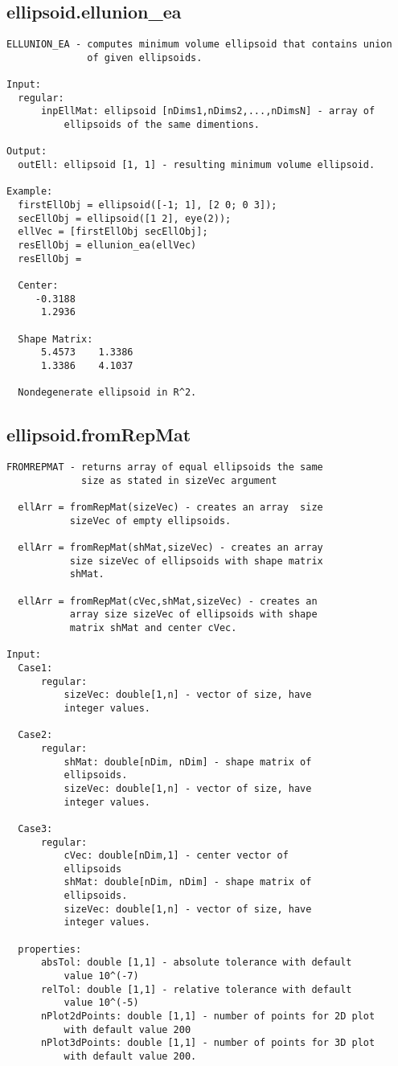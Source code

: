 \subsection{\texorpdfstring{ellipsoid.ellunion\_ea}{ellunion\_ea}}\label{method:ellipsoid.ellunionea}
\begin{verbatim}
ELLUNION_EA - computes minimum volume ellipsoid that contains union
              of given ellipsoids.

Input:
  regular:
      inpEllMat: ellipsoid [nDims1,nDims2,...,nDimsN] - array of
          ellipsoids of the same dimentions.

Output:
  outEll: ellipsoid [1, 1] - resulting minimum volume ellipsoid.

Example:
  firstEllObj = ellipsoid([-1; 1], [2 0; 0 3]);
  secEllObj = ellipsoid([1 2], eye(2));
  ellVec = [firstEllObj secEllObj];
  resEllObj = ellunion_ea(ellVec)
  resEllObj =

  Center:
     -0.3188
      1.2936

  Shape Matrix:
      5.4573    1.3386
      1.3386    4.1037

  Nondegenerate ellipsoid in R^2.
\end{verbatim}
\subsection{\texorpdfstring{ellipsoid.fromRepMat}{fromRepMat}}\label{method:ellipsoid.fromRepMat}
\begin{verbatim}
FROMREPMAT - returns array of equal ellipsoids the same
             size as stated in sizeVec argument

  ellArr = fromRepMat(sizeVec) - creates an array  size
           sizeVec of empty ellipsoids.

  ellArr = fromRepMat(shMat,sizeVec) - creates an array
           size sizeVec of ellipsoids with shape matrix
           shMat.

  ellArr = fromRepMat(cVec,shMat,sizeVec) - creates an
           array size sizeVec of ellipsoids with shape
           matrix shMat and center cVec.

Input:
  Case1:
      regular:
          sizeVec: double[1,n] - vector of size, have
          integer values.

  Case2:
      regular:
          shMat: double[nDim, nDim] - shape matrix of
          ellipsoids.
          sizeVec: double[1,n] - vector of size, have
          integer values.

  Case3:
      regular:
          cVec: double[nDim,1] - center vector of
          ellipsoids
          shMat: double[nDim, nDim] - shape matrix of
          ellipsoids.
          sizeVec: double[1,n] - vector of size, have
          integer values.

  properties:
      absTol: double [1,1] - absolute tolerance with default
          value 10^(-7)
      relTol: double [1,1] - relative tolerance with default
          value 10^(-5)
      nPlot2dPoints: double [1,1] - number of points for 2D plot
          with default value 200
      nPlot3dPoints: double [1,1] - number of points for 3D plot
          with default value 200.
\end{verbatim}
